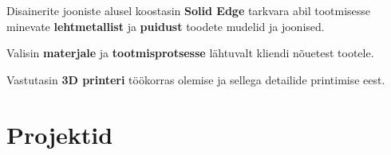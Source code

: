 \documentclass[letterpaper]{deedy-resume} %
\begin{document}
\begin{minipage}[t]{0.66\textwidth}
\sectionspace %



\begin{tightitemize}
  \item Disainerite jooniste alusel koostasin \textbf{Solid Edge} tarkvara abil tootmisesse minevate \textbf{lehtmetallist} ja \textbf{puidust} toodete mudelid ja joonised.
  \item Valisin \textbf{materjale} ja \textbf{tootmisprotsesse} lähtuvalt kliendi nõuetest tootele.
  \item Vastutasin \textbf{3D printeri} töökorras olemise ja sellega detailide printimise eest.
\end{tightitemize}

\sectionspace %



\section{Projektid}

%
%




\end{minipage}
\end{document}
